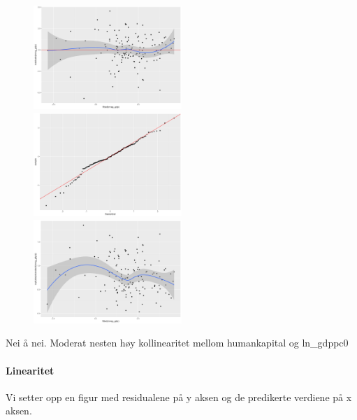 \documentclass[
  12pt,
  a4paper,
  DIV=11,
  numbers=noendperiod]{scrartcl}
\let\oldparagraph\paragraph
\renewcommand{\paragraph}[1]{\oldparagraph{#1}\mbox{}}
\begin{document}
\begin{figure}
  \vspace{-9mm}
  \centering
  \includegraphics[width=0.5\textwidth]{dokumentobjekter/figurer/linearitet.png}
  \label{fig:linearitet}
  \includegraphics[width=0.5\textwidth]{dokumentobjekter/figurer/normalitet.png}
  \label{fig:normalitet}
  \includegraphics[width=0.5\textwidth]{dokumentobjekter/figurer/homoskedasisitet.png}
  \label{fig:homoskedasisitet}
\end{figure}

Nei å nei. Moderat nesten høy kollinearitet mellom humankapital og
ln\_gdppc0

\paragraph{Linearitet}\label{linearitet}

Vi setter opp en figur med residualene på y aksen og de predikerte
verdiene på x aksen.
\end{document}
